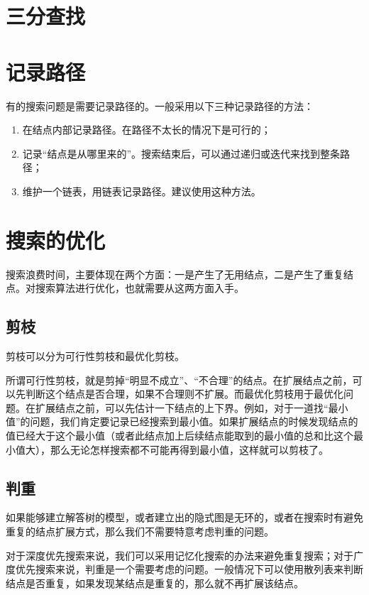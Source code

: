 \section{三分查找}


\section{记录路径}

有的搜索问题是需要记录路径的。一般采用以下三种记录路径的方法：

\begin{enumerate}
  \item 在结点内部记录路径。在路径不太长的情况下是可行的；
  \item 记录“结点是从哪里来的”。搜索结束后，可以通过递归或迭代来找到整条路径；
  \item 维护一个链表，用链表记录路径。建议使用这种方法。
\end{enumerate}

\section{搜索的优化}

搜索浪费时间，主要体现在两个方面：一是产生了无用结点，二是产生了重复结点。对搜索算法进行优化，也就需要从这两方面入手。

\subsection{剪枝}

剪枝可以分为可行性剪枝和最优化剪枝。

所谓可行性剪枝，就是剪掉“明显不成立”、“不合理”的结点。在扩展结点之前，可以先判断这个结点是否合理，如果不合理则不扩展。而最优化剪枝用于最优化问题。在扩展结点之前，可以先估计一下结点的上下界。例如，对于一道找“最小值”的问题，我们肯定要记录已经搜索到最小值。如果扩展结点的时候发现结点的值已经大于这个最小值（或者此结点加上后续结点能取到的最小值的总和比这个最小值大），那么无论怎样搜索都不可能再得到最小值，这样就可以剪枝了。

\subsection{判重}

如果能够建立解答树的模型，或者建立出的隐式图是无环的，或者在搜索时有避免重复的结点扩展方式，那么我们不需要特意考虑判重的问题。

对于深度优先搜索来说，我们可以采用记忆化搜索的办法来避免重复搜索；对于广度优先搜索来说，判重是一个需要考虑的问题。一般情况下可以使用散列表来判断结点是否重复，如果发现某结点是重复的，那么就不再扩展该结点。

